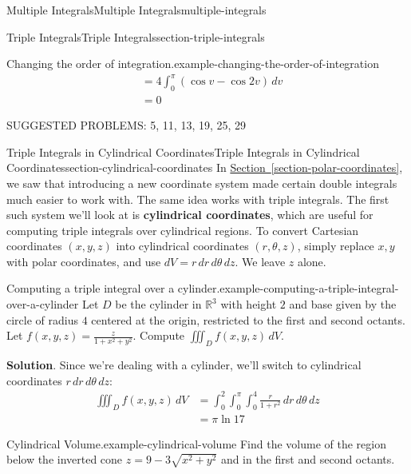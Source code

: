 \documentclass[oneside,10pt,]{book}
\newcommand{\terminology}[1]{\textbf{#1}}
\numberwithin{equation}{section}
\newcommand{\RR}{\mathbb{R}}
\begin{document}
\begin{chapterptx}{Multiple Integrals}{}{Multiple Integrals}{}{}{multiple-integrals}
\begin{sectionptx}{Triple Integrals}{}{Triple Integrals}{}{}{section-triple-integrals}
\begin{example}{Changing the order of integration.}{example-changing-the-order-of-integration}
\begin{align*}
& = 4\int_{0}^{\pi} (\cos v - \cos2v)\,dv \\
& = 0 
\end{align*}
%
\end{example}
\hypertarget{p-1523}{}%
SUGGESTED PROBLEMS: 5, 11, 13, 19, 25, 29%
\end{sectionptx}
%
%
\typeout{************************************************}
\typeout{************************************************}
%
\begin{sectionptx}{Triple Integrals in Cylindrical Coordinates}{}{Triple Integrals in Cylindrical Coordinates}{}{}{section-cylindrical-coordinates}
\hypertarget{p-1524}{}%
In \hyperref[section-polar-coordinates]{Section~\ref{section-polar-coordinates}}, we saw that introducing a new coordinate system made certain double integrals much easier to work with. The same idea works with triple integrals. The first such system we'll look at is \terminology{cylindrical coordinates}, which are useful for computing triple integrals over cylindrical regions. To convert Cartesian coordinates \((x,y,z)\) into cylindrical coordinates \((r,\theta,z)\), simply replace \(x,y\) with polar coordinates, and use \(dV = r\,dr\,d\theta\,dz\). We leave \(z\) alone.%
\begin{example}{Computing a triple integral over a cylinder.}{example-computing-a-triple-integral-over-a-cylinder}%
\hypertarget{p-1525}{}%
Let \(D\) be the cylinder in \(\RR^{3}\) with height \(2\) and base given by the circle of radius \(4\) centered at the origin, restricted to the first and second octants. Let \(f(x,y,z) = \frac{z}{1+x^{2}+y^{2}}\). Compute \(\iiint_{D}f(x,y,z)\,dV\).%
\par\smallskip%
\noindent\textbf{Solution}.\hypertarget{solution-252}{}\quad%
\hypertarget{p-1526}{}%
Since we're dealing with a cylinder, we'll switch to cylindrical coordinates \(r\,dr\,d\theta\,dz\):%
\begin{align*}
\iiint_{D}f(x,y,z)\,dV & = \int_{0}^{2}\int_{0}^{\pi}\int_{0}^{4}\frac{r}{1+r^{2}}\,dr\,d\theta\,dz \\
& = \pi\ln17 
\end{align*}
%
\end{example}
\begin{example}{Cylindrical Volume.}{example-cylindrical-volume}%
\hypertarget{p-1527}{}%
Find the volume of the region below the inverted cone \(z = 9 - 3\sqrt{x^{2} + y^{2}}\) and in the first and second octants.%
\par\smallskip%

\end{example}
\end{sectionptx}
\end{chapterptx}
\end{document}
